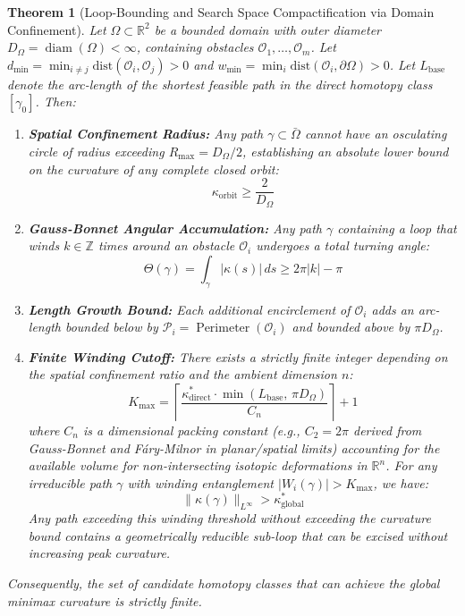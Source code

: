 \documentclass[11pt,reqno]{amsart}
\newtheorem{theorem}{Theorem}[section]
\theoremstyle{definition}
\providecommand{\R}{\mathbb{R}}
\newcommand{\Z}{\mathbb{Z}}
\newcommand{\dist}{\mathrm{dist}}
\numberwithin{equation}{section}
\providecommand{\R}{\mathbb{R}}
\begin{document}
\begin{theorem}[Loop-Bounding and Search Space Compactification via Domain Confinement]
\label{thm:loop_bounding}
Let $\Omega \subset \R^2$ be a bounded domain with outer diameter $D_{\Omega} = \operatorname{diam}(\Omega) < \infty$, containing obstacles $\mathcal{O}_1, \dots, \mathcal{O}_m$. Let $d_{\min} = \min_{i \ne j} \dist(\mathcal{O}_i, \mathcal{O}_j) > 0$ and $w_{\min} = \min_i \dist(\mathcal{O}_i, \partial\Omega) > 0$. Let $L_{\mathrm{base}}$ denote the arc-length of the shortest feasible path in the direct homotopy class $[\gamma_0]$.
Then:
\begin{enumerate}
    \item \textbf{Spatial Confinement Radius:} Any path $\gamma \subset \bar{\Omega}$ cannot have an osculating circle of radius exceeding $R_{\max} = D_{\Omega} / 2$, establishing an absolute lower bound on the curvature of any complete closed orbit:
    \begin{equation}
    \kappa_{\mathrm{orbit}} \ge \frac{2}{D_{\Omega}}
    \end{equation}
    \item \textbf{Gauss-Bonnet Angular Accumulation:} Any path $\gamma$ containing a loop that winds $k \in \Z$ times around an obstacle $\mathcal{O}_i$ undergoes a total turning angle:
    \begin{equation}
    \Theta(\gamma) = \int_\gamma |\kappa(s)|\,ds \ge 2\pi |k| - \pi
    \end{equation}
    \item \textbf{Length Growth Bound:} Each additional encirclement of $\mathcal{O}_i$ adds an arc-length bounded below by $\mathcal{P}_i = \operatorname{Perimeter}(\mathcal{O}_i)$ and bounded above by $\pi D_{\Omega}$.
    \item \textbf{Finite Winding Cutoff:} There exists a strictly finite integer depending on the spatial confinement ratio and the ambient dimension $n$:
    \begin{equation}
    K_{\max} = \left\lceil \frac{\kappa^*_{\mathrm{direct}} \cdot \min(L_{\mathrm{base}}, \, \pi D_{\Omega})}{C_n} \right\rceil + 1
    \end{equation}
    where $C_n$ is a dimensional packing constant (e.g., $C_2 = 2\pi$ derived from Gauss-Bonnet and Fáry-Milnor in planar/spatial limits) accounting for the available volume for non-intersecting isotopic deformations in $\R^n$. For any irreducible path $\gamma$ with winding entanglement $|W_i(\gamma)| > K_{\max}$, we have:
    \begin{equation}
    \|\kappa(\gamma)\|_{L^\infty} > \kappa^*_{\mathrm{global}}
    \end{equation}
    Any path exceeding this winding threshold without exceeding the curvature bound contains a geometrically reducible sub-loop that can be excised without increasing peak curvature.
\end{enumerate}
Consequently, the set of candidate homotopy classes that can achieve the global minimax curvature is strictly finite.
\end{theorem}
\end{document}
